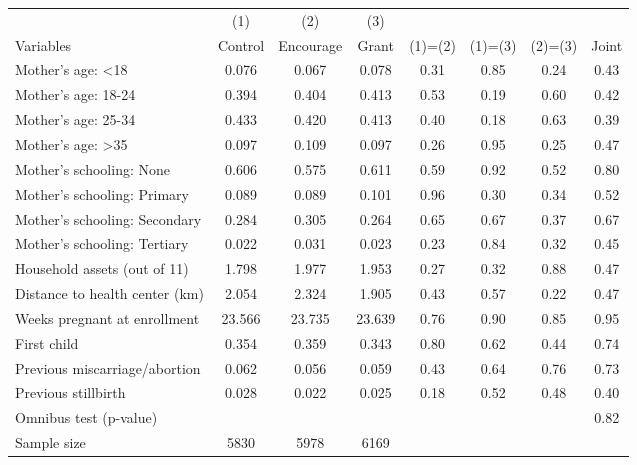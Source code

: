 \small\begin{tabular}{lccccccc} 
\toprule 
                       &    (1)        &   (2)         &   (3)         &                       &                       &                       &  \\
Variables      & Control       & Encourage     & Grant         & (1)=(2)       & (1)=(3)       & (2)=(3)       & Joint\\
\midrule 
Mother's age: <18 & 0.076 & 0.067  & 0.078 & 0.31 & 0.85 & 0.24 & 0.43\\
Mother's age: 18-24 & 0.394 & 0.404  & 0.413 & 0.53 & 0.19 & 0.60 & 0.42\\
Mother's age: 25-34 & 0.433 & 0.420  & 0.413 & 0.40 & 0.18 & 0.63 & 0.39\\
Mother's age: >35 & 0.097 & 0.109  & 0.097 & 0.26 & 0.95 & 0.25 & 0.47\\
Mother's schooling: None & 0.606 & 0.575  & 0.611 & 0.59 & 0.92 & 0.52 & 0.80\\
Mother's schooling: Primary & 0.089 & 0.089  & 0.101 & 0.96 & 0.30 & 0.34 & 0.52\\
Mother's schooling: Secondary & 0.284 & 0.305  & 0.264 & 0.65 & 0.67 & 0.37 & 0.67\\
Mother's schooling: Tertiary & 0.022 & 0.031  & 0.023 & 0.23 & 0.84 & 0.32 & 0.45\\
Household assets (out of 11) & 1.798 & 1.977  & 1.953 & 0.27 & 0.32 & 0.88 & 0.47\\
Distance to health center (km) & 2.054 & 2.324  & 1.905 & 0.43 & 0.57 & 0.22 & 0.47\\
Weeks pregnant at enrollment & 23.566 & 23.735  & 23.639 & 0.76 & 0.90 & 0.85 & 0.95\\
First child & 0.354 & 0.359  & 0.343 & 0.80 & 0.62 & 0.44 & 0.74\\
Previous miscarriage/abortion & 0.062 & 0.056  & 0.059 & 0.43 & 0.64 & 0.76 & 0.73\\
Previous stillbirth & 0.028 & 0.022  & 0.025 & 0.18 & 0.52 & 0.48 & 0.40\\
 Omnibus test (p-value) &   &   &  &  &  &  & 0.82  \\
\midrule 
 Sample size & 5830 & 5978  & 6169  &  &  &  &  \\
 \bottomrule 
\end{tabular} 
